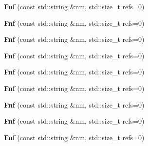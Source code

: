 \begin{DoxyCompactItemize}
{\bfseries Fnf} (const std\+::string \&nm, std\+::size\+\_\+t refs=0)
\item 
\mbox{\label{class_fnf_a91782f37db6eb323dec48f84f87ed60b}} 
{\bfseries Fnf} (const std\+::string \&nm, std\+::size\+\_\+t refs=0)
\item 
\mbox{\label{class_fnf_a91782f37db6eb323dec48f84f87ed60b}} 
{\bfseries Fnf} (const std\+::string \&nm, std\+::size\+\_\+t refs=0)
\item 
\mbox{\label{class_fnf_a91782f37db6eb323dec48f84f87ed60b}} 
{\bfseries Fnf} (const std\+::string \&nm, std\+::size\+\_\+t refs=0)
\item 
\mbox{\label{class_fnf_a91782f37db6eb323dec48f84f87ed60b}} 
{\bfseries Fnf} (const std\+::string \&nm, std\+::size\+\_\+t refs=0)
\item 
\mbox{\label{class_fnf_a91782f37db6eb323dec48f84f87ed60b}} 
{\bfseries Fnf} (const std\+::string \&nm, std\+::size\+\_\+t refs=0)
\item 
\mbox{\label{class_fnf_a91782f37db6eb323dec48f84f87ed60b}} 
{\bfseries Fnf} (const std\+::string \&nm, std\+::size\+\_\+t refs=0)
\item 
\mbox{\label{class_fnf_a91782f37db6eb323dec48f84f87ed60b}} 
{\bfseries Fnf} (const std\+::string \&nm, std\+::size\+\_\+t refs=0)
\item 
\mbox{\label{class_fnf_a91782f37db6eb323dec48f84f87ed60b}} 
{\bfseries Fnf} (const std\+::string \&nm, std\+::size\+\_\+t refs=0)
\end{DoxyCompactItemize}


